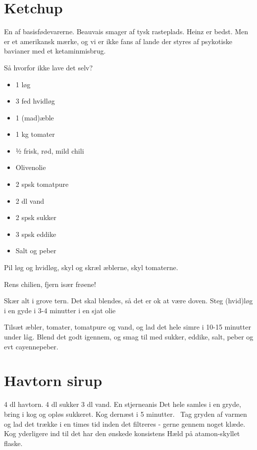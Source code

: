 \documentclass[
]{book}
\providecommand{\tightlist}{%
  \setlength{\itemsep}{0pt}\setlength{\parskip}{0pt}}
\begin{document}
\hypertarget{ketchup}{%
\section{Ketchup}\label{ketchup}}

En af basisfødevarerne. Beauvais smager af tysk rasteplads.
Heinz er bedst. Men er et amerikansk mærke, og vi er ikke fans af
lande der styres af psykotiske bavianer med et ketaminmisbrug.

Så hvorfor ikke lave det selv?

\begin{itemize}
\tightlist
\item
  1 løg
\item
  3 fed hvidløg
\item
  1 (mad)æble
\item
  1 kg tomater
\item
  ½ frisk, rød, mild chili
\item
  Olivenolie
\item
  2 spsk tomatpure
\item
  2 dl vand
\item
  2 spsk sukker
\item
  3 spsk eddike
\item
  Salt og peber
\end{itemize}

Pil løg og hvidløg, skyl og skræl æblerne, skyl tomaterne.

Rens chilien, fjern især frøene!

Skær alt i grove tern. Det skal blendes, så det er ok at være doven. Steg (hvid)løg i en gyde i 3-4 minutter i en sjat olie

Tilsæt æbler, tomater, tomatpure og vand, og lad det hele simre i 10-15 minutter under låg. Blend det godt igennem, og smag til med sukker, eddike, salt, peber og evt cayennepeber.

\hypertarget{havtorn-sirup}{%
\section{Havtorn sirup}\label{havtorn-sirup}}

4 dl havtorn.
4 dl sukker
3 dl vand.
En stjerneanis
Det hele samles i en gryde, bring i kog og opløs sukkeret.
Kog dernæst i 5 minutter.~
Tag gryden af varmen og lad det trække i en times tid inden det filtreres - gerne gennem noget klæde.~
Kog yderligere ind til det har den ønskede konsistens
Hæld på atamon-skyllet flaske.
\end{document}
